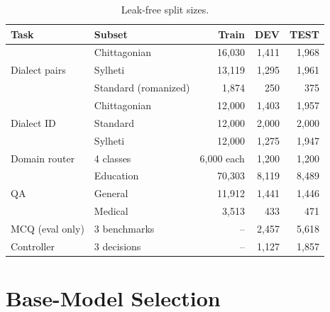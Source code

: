 \begin{table}[!t]
\centering
\caption{Leak-free split sizes.}
\label{tab:splits}
\scriptsize
\begin{tabular}{@{}llrrr@{}}
\toprule
Task & Subset & Train & DEV & TEST \\
\midrule
\multirow{3}{*}{Dialect pairs} & Chittagonian & 16,030 & 1,411 & 1,968 \\
 & Sylheti & 13,119 & 1,295 & 1,961 \\
 & Standard (romanized) & 1,874 & 250 & 375 \\
\multirow{3}{*}{Dialect ID} & Chittagonian & 12,000 & 1,403 & 1,957 \\
 & Standard & 12,000 & 2,000 & 2,000 \\
 & Sylheti & 12,000 & 1,275 & 1,947 \\
Domain router & 4 classes & 6,000 each & 1,200 & 1,200 \\
\multirow{3}{*}{QA} & Education & 70,303 & 8,119 & 8,489 \\
 & General & 11,912 & 1,441 & 1,446 \\
 & Medical & 3,513 & 433 & 471 \\
MCQ (eval only) & 3 benchmarks & -- & 2,457 & 5,618 \\
Controller & 3 decisions & -- & 1,127 & 1,857 \\
\bottomrule
\end{tabular}
\end{table}

\begin{table}[!t]
\centering
\caption{Knowledge bases (searched, never trained on).}
\label{tab:kb}
\scriptsize
{}
\end{table}

\section{Base-Model Selection}
\label{sec:models}


